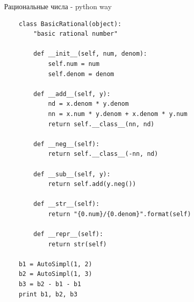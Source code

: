 \documentclass{article}
\begin{document}
\begin{center} Рациональные числа - python way \end{center}
\begin{lstlisting}
    class BasicRational(object):
        "basic rational number"

        def __init__(self, num, denom):
            self.num = num
            self.denom = denom

        def __add__(self, y):
            nd = x.denom * y.denom
            nn = x.num * y.denom + x.denom * y.num
            return self.__class__(nn, nd)

        def __neg__(self):
            return self.__class__(-nn, nd)

        def __sub__(self, y):
            return self.add(y.neg())

        def __str__(self):
            return "{0.num}/{0.denom}".format(self)

        def __repr__(self):
            return str(self)

    b1 = AutoSimpl(1, 2)
    b2 = AutoSimpl(1, 3)
    b3 = b2 - b1 - b1
    print b1, b2, b3
\end{lstlisting}
\newpage

\end{document}
